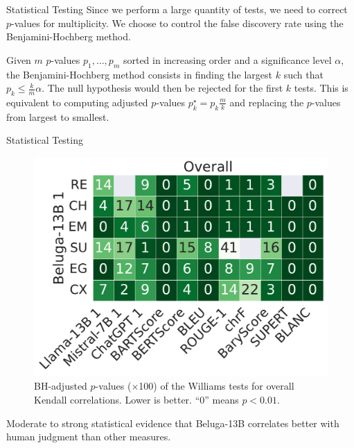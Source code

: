 \begin{frame}{Statistical Testing}
    Since we perform a large quantity of tests, we need to correct $p$-values for multiplicity. We choose to control the false discovery rate using the Benjamini-Hochberg method.
    \begin{definition}
        Given $m$ $p$-values $p_1, \dots, p_m$ sorted in increasing order and a significance level $\alpha$, the Benjamini-Hochberg method consists in finding the largest $k$ such that $p_k \leq \frac{k}{m} \alpha$. The null hypothesis would then be rejected for the first $k$ tests. This is equivalent to computing adjusted $p$-values $p_k^\star = p_k \frac{m}{k}$ and replacing the $p$-values from largest to smallest.
    \end{definition}
\end{frame}

\begin{frame}{Statistical Testing}
    \begin{figure}[!h]
        \centering
        \includegraphics[width=0.6\columnwidth]{pictures/llm_williams_kendall_story_bh.pdf}
        \caption{BH-adjusted $p$-values ($\times$100) of the Williams tests for overall Kendall correlations. Lower is better. ``0'' means $p<0.01$.}
        \label{fig:williams_beluga_story}
    \end{figure}
    \vspace*{-0.4cm}
    Moderate to strong statistical evidence that Beluga-13B correlates better with human judgment than other measures.
\end{frame}

